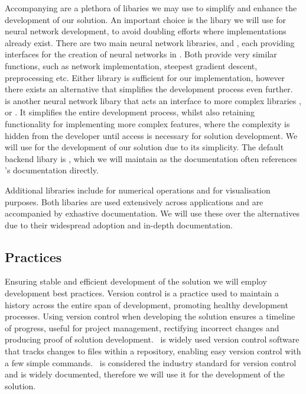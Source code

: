 Accompanying  are a plethora of libaries we may use to simplify and enhance the development of our solution. An important choice is the libary we will use for neural network development, to avoid doubling efforts where implementations already exist. There are two main neural network libraries,  and , each providing interfaces for the creation of neural networks in . Both provide very similar functions, such as network implementation, steepest gradient descent, preprocessing etc. Either library is sufficient for our implementation, however there exists an alternative that simplifies the development process even further.\  is another neural network libary that acts an interface to more complex libraries ,  or . It simplifies the entire development process, whilst also retaining functionality for implementing more complex features, where the complexity is hidden from the developer until access is necessary for solution development. We will use  for the development of our solution due to its simplicity. The default backend libary is , which we will maintain as the  documentation often references 's documentation directly.

Additional  libraries include  for numerical operations and  for visualisation purposes. Both libaries are used extensively across  applications and are accompanied by exhastive documentation. We will use these over the alternatives due to their widespread adoption and in-depth documentation.

\subsection{Practices}
Ensuring stable and efficient development of the solution we will employ development best practices. Version control is a practice used to maintain a history across the entire span of development, promoting healthy development processes. Using version control when developing the solution ensures a timeline of progress, useful for project management, rectifying incorrect changes and producing proof of solution development.\  is widely used version control software that tracks changes to files within a repository, enabling easy version control with a few simple commands.\  is considered the industry standard for version control and is widely documented, therefore we will use it for the development of the solution.

